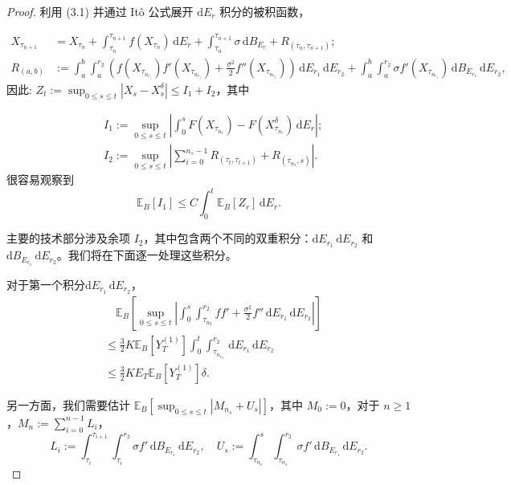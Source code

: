 \begin{proof}
	
	利用 (3.1) 并通过 Itô 公式展开 $\mathrm{d}E_r$ 积分的被积函数，
	
	$$
	\begin{aligned}
		X_{\tau_{n+1}} &= X_{\tau_n} +  \int_{\tau_n}^{\tau_{n+1}} f(X_{\tau_n}) \, \mathrm{d}E_r + \int_{\tau_n}^{\tau_{n+1}} \sigma \, \mathrm{d}B_{E_r} + R_{(\tau_n, \tau_{n+1})}; \\
		R_{(a,b)} &:=  \int_a^b \int_a^{r_2} \left( f(X_{\tau_{n_{r_1}}})f'(X_{\tau_{n_{r_1}}}) + \frac{\sigma ^2}{2} f''(X_{\tau_{n_{r_1}}})  \right) \, \mathrm{d}E_{r_1} \, \mathrm{d}E_{r_2} + \int_a^b \int_a^{r_2} \sigma f'(X_{\tau_{n_{r_1}}})   \, \mathrm{d}B_{E_{r_1}} \, \mathrm{d}E_{r_2},
	\end{aligned}
	$$
	因此:
	$Z_t := \sup_{0 \leq s \leq t} | X_s - {X_s^\delta} | \leq I_1 + I_2 $，其中
	
	$$
	\begin{aligned}
		&I_1 := \sup_{0 \leq s \leq t} \left| \int_0^s F(X_{\tau_{n_r}}) - F(X_{\tau_{n_r}}^\delta)  \, \mathrm{d}E_r \right|; \\
		&I_2 := \sup_{0 \leq s \leq t} \left| \sum_{i=0}^{n_s - 1} R_{(\tau_{t}, \tau_{t+1})} + R_{(\tau_{n_s}, s)} \right|.
	\end{aligned}
	$$
	很容易观察到
	\begin{equation}\label{I1}
		\mathbb{E}_B[I_1] \leq C \int_0^t \mathbb{E}_B[Z_r] \, \mathrm{d}E_r.
	\end{equation}
	
	主要的技术部分涉及余项 $I_2$，其中包含两个不同的双重积分：$\mathrm{d}E_{r_1} \, \mathrm{d}E_{r_2}$ 和 $\mathrm{d}B_{E_{r_1}} \, \mathrm{d}E_{r_2}$。我们将在下面逐一处理这些积分。
	
	对于第一个积分$ \mathrm{d}E_{r_1} \, \mathrm{d}E_{r_2}$，
	\begin{align}
		& \quad \mathbb{E}_B \left[\sup_{0 \leq s \leq t} \left| \int_0^s \int_{\tau_{n_2}}^{r_2} ff'  + \frac{\sigma^2}{2} f'' \, \mathrm{d}E_{r_1} \, \mathrm{d}E_{r_2} \right|\right] \nonumber \\
		&\leq  \frac{3}{2}K \mathbb{E}_B[Y_T^{(1)}] \int_0^t \int_{\tau_{n_{r_2}}}^{r_2} \, \mathrm{d}E_{r_1} \, \mathrm{d}E_{r_2} \nonumber \\
		&\leq  \frac{3}{2}K E_T \mathbb{E}_B[Y_T^{(1)}] \delta.  \label{I21}
	\end{align}
	
	另一方面，我们需要估计 $\mathbb{E}_B \left[\sup_{0 \leq s \leq t} |M_{n_s} + U_s|\right]$，其中 $M_0 := 0$，对于 $n \geq 1$，$M_n := \sum_{i=0}^{n-1} L_i$，
	$$
	L_i := \int_{\tau_i}^{\tau_{i+1}} \int_{\tau_i}^{r_2} \sigma f' \, \mathrm{d}B_{E_{r_1}} \, \mathrm{d}E_{r_2}, \quad U_s := \int_{\tau_{n_s}}^s \int_{\tau_{n_s}}^{r_2} \sigma f' \, \mathrm{d}B_{E_{r_1}} \, \mathrm{d}E_{r_2}.
	$$
	

\end{proof}
